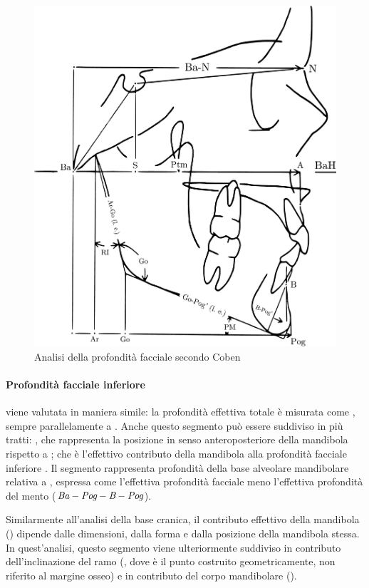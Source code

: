\begin{figure}[ht]
\centering
\includegraphics[width=.6\columnwidth]{./images/coben_profondita_facciale.pdf}
\caption{Analisi della profondità facciale secondo Coben}
\label{fig:coben_profondita_facciale}
\end{figure}

\paragraph{Profondità facciale inferiore} viene valutata in maniera simile: la profondità effettiva totale è misurata come , sempre parallelamente a . Anche questo segmento può essere suddiviso in più tratti: , che rappresenta la posizione in senso anteroposteriore della mandibola rispetto a ;  che è l'effettivo contributo della mandibola alla profondità facciale inferiore . Il segmento  rappresenta profondità della base alveolare mandibolare relativa a , espressa come l'effettiva profondità facciale meno l'effettiva profondità del mento ($\textit{Ba}-\textit{Pog} - \textit{B}-\textit{Pog}$).

Similarmente all'analisi della base cranica, il contributo effettivo della mandibola () dipende dalle dimensioni, dalla forma e dalla posizione della mandibola stessa. In quest'analisi, questo segmento viene ulteriormente suddiviso in contributo dell'in\-cli\-na\-zio\-ne del ramo (, dove  è il punto costruito geometricamente, non riferito al margine osseo) e in contributo del corpo mandibolare ().

